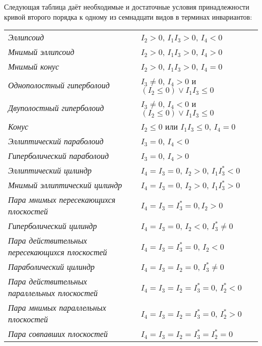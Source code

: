 \begin{theorem}
    Следующая таблица даёт необходимые и достаточные условия принадлежности кривой второго порядка к одному из семнадцати видов в терминах инвариантов:
    \begin{tabular}{| l | l |}
        \hline
        \textit{Эллипсоид} & $I_2 > 0$, $I_1I_3 > 0$, $I_4 < 0$\\
        \textit{Мнимый эллипсоид} & $I_2 > 0$, $I_1I_3 > 0$, $I_4 > 0$\\
        \textit{Мнимый конус} & $I_2 > 0$, $I_1I_3 > 0$, $I_4 = 0$\\
        \textit{Однополостный гиперболоид} & $I_3 \ne 0$, $I_4 > 0$ и $(I_2 \leqslant 0) \vee I_1I_3 \leqslant 0$\\
        \textit{Двуполостный гиперболоид} & $I_3 \ne 0$, $I_4 < 0$ и $(I_2 \leqslant 0) \vee I_1I_3 \leqslant 0$\\
        \textit{Конус} & $I_2 \leqslant 0$ или $I_1I_3 \leqslant 0$, $I_4 = 0$\\
        \textit{Эллиптический параболоид} & $I_3 = 0$, $I_4 < 0$\\
        \textit{Гиперболический параболоид} & $I_3 = 0$, $I_4 > 0$\\
        \hline
        \textit{Эллиптический цилиндр} & $I_4 = I_3 = 0$, $I_2 > 0$, $I_1I_3^\ast < 0$\\
        \textit{Мнимый эллиптический цилиндр} & $I_4 = I_3 = 0$, $I_2 > 0$, $I_1I_3^\ast > 0$\\
        \textit{Пара мнимых пересекающихся плоскостей} & $I_4 = I_3 = I_3^\ast = 0, I_2 > 0$\\
        \textit{Гиперболический цилиндр} & $I_4 = I_3 = 0$, $I_2 < 0$, $I_3^\ast \ne 0$\\
        \textit{Пара действительных пересекающихся плоскостей} & $I_4 = I_3 = I_3^\ast = 0$, $I_2 < 0$\\
        \textit{Параболический цилиндр} & $I_4 = I_3 = I_2 = 0$, $I_3^\ast \ne 0$\\
        \textit{Пара действительных параллельных плоскостей} & $I_4 = I_3 = I_2 = I_3^\ast = 0$, $I_2^\ast < 0$\\
        \textit{Пара мнимых параллельных плоскостей} & $I_4 = I_3 = I_2 = I_3^\ast = 0$, $I_2^\ast > 0$\\
        \textit{Пара совпавших плоскостей} & $I_4 = I_3 = I_2 = I_3^\ast = I_2^\ast = 0$\\
        \hline
    \end{tabular}
\end{theorem}

